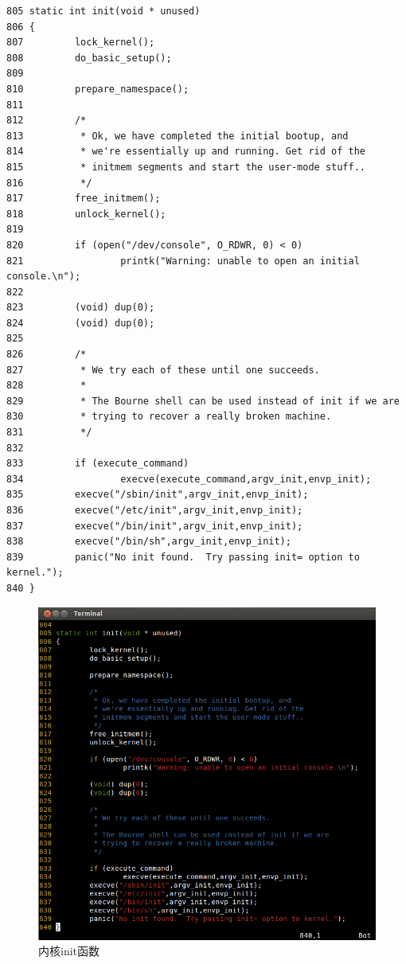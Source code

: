 {\begin{shaded}\begin{verbatim}
805 static int init(void * unused)
806 {
807         lock_kernel();
808         do_basic_setup();
809 
810         prepare_namespace();
811 
812         /*
813          * Ok, we have completed the initial bootup, and
814          * we're essentially up and running. Get rid of the
815          * initmem segments and start the user-mode stuff..
816          */
817         free_initmem();
818         unlock_kernel();
819 
820         if (open("/dev/console", O_RDWR, 0) < 0)
821                 printk("Warning: unable to open an initial console.\n");
822 
823         (void) dup(0);
824         (void) dup(0);
825 
826         /*
827          * We try each of these until one succeeds.
828          *
829          * The Bourne shell can be used instead of init if we are 
830          * trying to recover a really broken machine.
831          */
832 
833         if (execute_command)
834                 execve(execute_command,argv_init,envp_init);
835         execve("/sbin/init",argv_init,envp_init);
836         execve("/etc/init",argv_init,envp_init);
837         execve("/bin/init",argv_init,envp_init);
838         execve("/bin/sh",argv_init,envp_init);
839         panic("No init found.  Try passing init= option to kernel.");
840 }
\end{verbatim}\end{shaded}}
\begin{figure}[htbp]
\centering
\includegraphics{./pictures/init.png}
\caption{内核init函数}
\end{figure}

